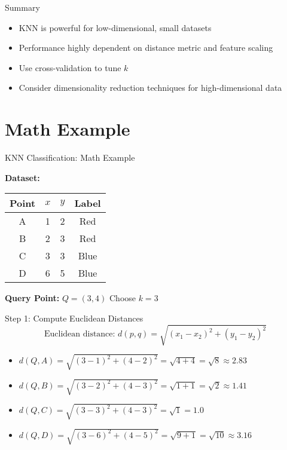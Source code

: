 \documentclass{beamer}
\begin{document}
\begin{frame}{Summary}
  \begin{itemize}
    \item KNN is powerful for low-dimensional, small datasets
    \item Performance highly dependent on distance metric and feature scaling
    \item Use cross-validation to tune $k$
    \item Consider dimensionality reduction techniques for high-dimensional data
  \end{itemize}
\end{frame}

\section{Math Example}
\begin{frame}{KNN Classification: Math Example}

\textbf{Dataset:}
\begin{tabular}{|c|c|c|c|}
\hline
Point & $x$ & $y$ & Label \\
\hline
A & 1 & 2 & Red \\
B & 2 & 3 & Red \\
C & 3 & 3 & Blue \\
D & 6 & 5 & Blue \\
\hline
\end{tabular}

\vspace{0.3cm}
\textbf{Query Point: } $Q = (3, 4)$ \hfill Choose $k = 3$

\end{frame}

\begin{frame}{Step 1: Compute Euclidean Distances}
\small
\[
\text{Euclidean distance: } d(p, q) = \sqrt{(x_1 - x_2)^2 + (y_1 - y_2)^2}
\]

\begin{itemize}
  \item $d(Q, A) = \sqrt{(3-1)^2 + (4-2)^2} = \sqrt{4 + 4} = \sqrt{8} \approx 2.83$
  \item $d(Q, B) = \sqrt{(3-2)^2 + (4-3)^2} = \sqrt{1 + 1} = \sqrt{2} \approx 1.41$
  \item $d(Q, C) = \sqrt{(3-3)^2 + (4-3)^2} = \sqrt{1} = 1.0$
  \item $d(Q, D) = \sqrt{(3-6)^2 + (4-5)^2} = \sqrt{9 + 1} = \sqrt{10} \approx 3.16$
\end{itemize}

\end{frame}
\end{document}
